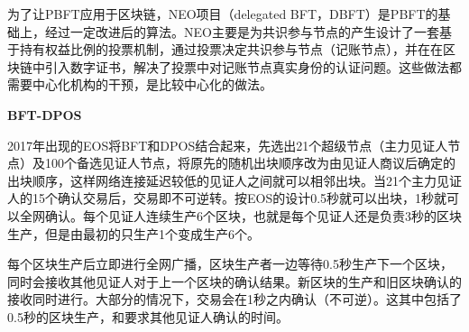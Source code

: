 \documentclass[a4paper,12pt]{article}
\begin{document}
为了让PBFT应用于区块链，NEO项目（delegated BFT，DBFT）是PBFT的基础上，经过一定改进后的算法。NEO主要是为共识参与节点的产生设计了一套基于持有权益比例的投票机制，通过投票决定共识参与节点（记账节点），并在在区块链中引入数字证书，解决了投票中对记账节点真实身份的认证问题。这些做法都需要中心化机构的干预，是比较中心化的做法。



\textbf{BFT-DPOS}



2017年出现的EOS将BFT和DPOS结合起来，先选出21个超级节点（主力见证人节点）及100个备选见证人节点，将原先的随机出块顺序改为由见证人商议后确定的出块顺序，这样网络连接延迟较低的见证人之间就可以相邻出块。当21个主力见证人的15个确认交易后，交易即不可逆转。按EOS的设计0.5秒就可以出块，1秒就可以全网确认。每个见证人连续生产6个区块，也就是每个见证人还是负责3秒的区块生产，但是由最初的只生产1个变成生产6个。%

每个区块生产后立即进行全网广播，区块生产者一边等待0.5秒生产下一个区块，同时会接收其他见证人对于上一个区块的确认结果。新区块的生产和旧区块确认的接收同时进行。大部分的情况下，交易会在1秒之内确认（不可逆）。这其中包括了0.5秒的区块生产，和要求其他见证人确认的时间。

\end{document}
